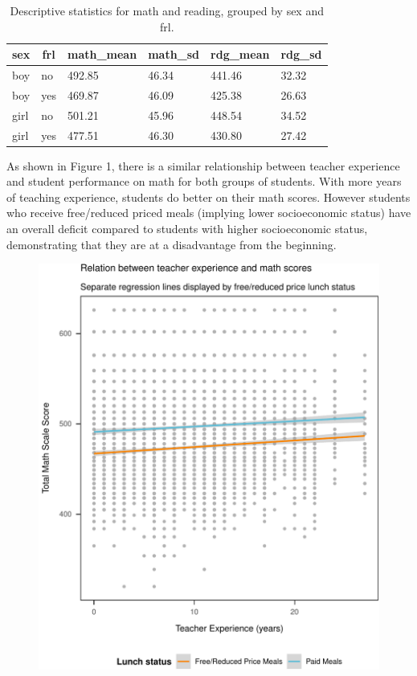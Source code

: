 \documentclass[man,floatsintext]{apa6}
\begin{document}
\begin{table}[h]
\begin{center}
\begin{threeparttable}
\caption{\label{tab:create_table}Descriptive statistics for math and reading, grouped by sex and frl.}
\begin{tabular}{llllll}
\toprule
sex & \multicolumn{1}{c}{frl} & \multicolumn{1}{c}{math\_mean} & \multicolumn{1}{c}{math\_sd} & \multicolumn{1}{c}{rdg\_mean} & \multicolumn{1}{c}{rdg\_sd}\\
\midrule
boy & no & 492.85 & 46.34 & 441.46 & 32.32\\
boy & yes & 469.87 & 46.09 & 425.38 & 26.63\\
girl & no & 501.21 & 45.96 & 448.54 & 34.52\\
girl & yes & 477.51 & 46.30 & 430.80 & 27.42\\
\bottomrule
\end{tabular}
\end{threeparttable}
\end{center}
\end{table}

As shown in Figure 1, there is a similar relationship between teacher
experience and student performance on math for both groups of students.
With more years of teaching experience, students do better on their math
scores. However students who receive free/reduced priced meals (implying
lower socioeconomic status) have an overall deficit compared to students
with higher socioeconomic status, demonstrating that they are at a
disadvantage from the beginning.

\begin{figure}
\centering
\includegraphics{lab_8_apa_document_files/figure-latex/create plot-1.pdf}
\caption{}
\end{figure}
\end{document}
